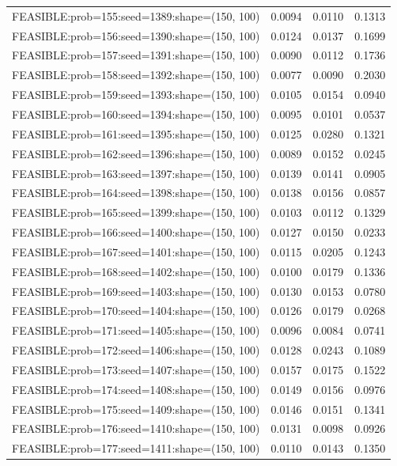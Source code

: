 \begin{longtable}{lccc}
FEASIBLE:prob=155:seed=1389:shape=(150, 100) & 0.0094 & 0.0110 & 0.1313 \\
FEASIBLE:prob=156:seed=1390:shape=(150, 100) & 0.0124 & 0.0137 & 0.1699 \\
FEASIBLE:prob=157:seed=1391:shape=(150, 100) & 0.0090 & 0.0112 & 0.1736 \\
FEASIBLE:prob=158:seed=1392:shape=(150, 100) & 0.0077 & 0.0090 & 0.2030 \\
FEASIBLE:prob=159:seed=1393:shape=(150, 100) & 0.0105 & 0.0154 & 0.0940 \\
FEASIBLE:prob=160:seed=1394:shape=(150, 100) & 0.0095 & 0.0101 & 0.0537 \\
FEASIBLE:prob=161:seed=1395:shape=(150, 100) & 0.0125 & 0.0280 & 0.1321 \\
FEASIBLE:prob=162:seed=1396:shape=(150, 100) & 0.0089 & 0.0152 & 0.0245 \\
FEASIBLE:prob=163:seed=1397:shape=(150, 100) & 0.0139 & 0.0141 & 0.0905 \\
FEASIBLE:prob=164:seed=1398:shape=(150, 100) & 0.0138 & 0.0156 & 0.0857 \\
FEASIBLE:prob=165:seed=1399:shape=(150, 100) & 0.0103 & 0.0112 & 0.1329 \\
FEASIBLE:prob=166:seed=1400:shape=(150, 100) & 0.0127 & 0.0150 & 0.0233 \\
FEASIBLE:prob=167:seed=1401:shape=(150, 100) & 0.0115 & 0.0205 & 0.1243 \\
FEASIBLE:prob=168:seed=1402:shape=(150, 100) & 0.0100 & 0.0179 & 0.1336 \\
FEASIBLE:prob=169:seed=1403:shape=(150, 100) & 0.0130 & 0.0153 & 0.0780 \\
FEASIBLE:prob=170:seed=1404:shape=(150, 100) & 0.0126 & 0.0179 & 0.0268 \\
FEASIBLE:prob=171:seed=1405:shape=(150, 100) & 0.0096 & 0.0084 & 0.0741 \\
FEASIBLE:prob=172:seed=1406:shape=(150, 100) & 0.0128 & 0.0243 & 0.1089 \\
FEASIBLE:prob=173:seed=1407:shape=(150, 100) & 0.0157 & 0.0175 & 0.1522 \\
FEASIBLE:prob=174:seed=1408:shape=(150, 100) & 0.0149 & 0.0156 & 0.0976 \\
FEASIBLE:prob=175:seed=1409:shape=(150, 100) & 0.0146 & 0.0151 & 0.1341 \\
FEASIBLE:prob=176:seed=1410:shape=(150, 100) & 0.0131 & 0.0098 & 0.0926 \\
FEASIBLE:prob=177:seed=1411:shape=(150, 100) & 0.0110 & 0.0143 & 0.1350 \\

\end{longtable}
